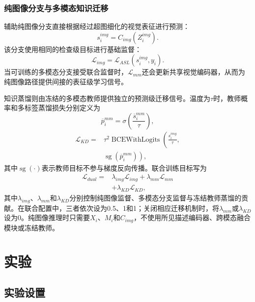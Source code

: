 \documentclass[Afour,sagev,times]{sagej}
\begin{document}
\subsubsection{纯图像分支与多模态知识迁移}

辅助纯图像分支直接根据经过超图细化的视觉表征进行预测：
\begin{equation}
s_i^{img}=C_{img}(Z_i^{img}).
\end{equation}
该分支使用相同的检查级目标进行基础监督：
\begin{equation}
\mathcal{L}_{img}=\mathcal{L}_{ASL}(s_i^{img},y_i).
\end{equation}
当可训练的多模态分支接受联合监督时，$\mathcal{L}_{mm}$还会更新共享视觉编码器，从而为纯图像路径提供间接的表征级学习信号。

知识蒸馏则由冻结的多模态教师提供独立的预测级迁移信号。温度为$\tau$时，教师概率和多标签蒸馏损失分别定义为
\begin{equation}
\overline{p}_i^{mm}=\sigma\!\left(\frac{\overline{s}_i^{mm}}{\tau}\right),
\end{equation}
\begin{equation}
\begin{aligned}
\mathcal{L}_{KD}={}&\tau^2\operatorname{BCEWithLogits}\!\left(
\frac{s_i^{img}}{\tau},\right.\\
&\left.\operatorname{sg}(\overline{p}_i^{mm})\right),
\end{aligned}
\end{equation}
其中$\operatorname{sg}(\cdot)$表示教师目标不参与梯度反向传播。联合训练目标写为
\begin{equation}
\begin{aligned}
\mathcal{L}_{dual}={}&\lambda_{img}\mathcal{L}_{img}+\lambda_{mm}\mathcal{L}_{mm}\\
&+\lambda_{KD}\mathcal{L}_{KD},
\end{aligned}
\end{equation}
其中$\lambda_{img}$、$\lambda_{mm}$和$\lambda_{KD}$分别控制纯图像监督、多模态分支监督与冻结教师蒸馏的贡献。在联合配置中，三者依次设为0.5、1和1；关闭相应迁移机制时，将$\lambda_{mm}$或$\lambda_{KD}$设为0。纯图像推理时只需要$X_i$、$M_i$和$C_{img}$，不使用所见描述编码器、跨模态融合模块或冻结教师。

\section{实验}

\subsection{实验设置}
\end{document}
